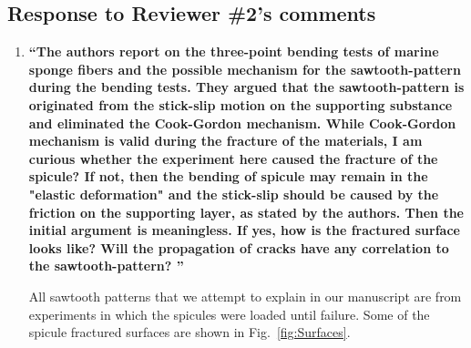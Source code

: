 \documentclass[11pt,letterpaper]{report}
\begin{document}
\begin{enumerate}[label=\textit{1.\arabic*},wide, labelwidth=!, labelindent=0pt]





\clearpage

\section*{Response to Reviewer \#2's comments}
\label{rev2}

\begin{enumerate}[label=\textit{2.\arabic*},wide, labelindent=0pt]

\item \label{r2c1}{\bf ``The authors report on the three-point bending tests of marine sponge fibers and the possible mechanism for the sawtooth-pattern during the bending tests. They argued that the sawtooth-pattern is originated from the stick-slip motion on the supporting substance and eliminated the Cook-Gordon mechanism.
While Cook-Gordon mechanism is valid during the fracture of the materials, I am curious whether the experiment here caused the fracture of the spicule?
If not, then the bending of spicule may remain in the "elastic deformation" and the stick-slip should be caused by the friction on the supporting layer, as stated by the authors. Then the initial argument is meaningless.
If yes, how is the fractured surface looks like? Will the propagation of cracks have any correlation to the sawtooth-pattern? ''}



All  sawtooth patterns that we attempt to explain in our manuscript are from experiments in which the spicules were loaded until failure. Some of the spicule
 fractured surfaces are shown in Fig.~\ref{fig:Surfaces}.


\end{enumerate}
\end{enumerate}
\end{document}
